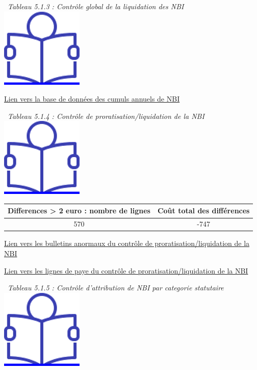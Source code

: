 ~\emph{Tableau 5.1.3 : Contrôle global de la liquidation des NBI} ~
\href{../Docs/Notices/fiche_NBI_glob.odt}{\includegraphics{icones/Notice.png}}

\href{../Bases/Fiabilite/cumuls.nbi.csv}{Lien vers la base de données des
cumuls annuels de NBI}

~\emph{Tableau 5.1.4 : Contrôle de proratisation/liquidation de la NBI}
~
\href{../Docs/Notices/fiche_NBI_prorat.odt}{\includegraphics{icones/Notice.png}}

\begin{longtable}[]{@{}cc@{}}
\toprule
Differences \textgreater{} 2 euro : nombre de lignes & Coût total des
différences\tabularnewline
\midrule
\endhead
570 & -747\tabularnewline
\bottomrule
\end{longtable}

\href{../Bases/Fiabilite/lignes.nbi.anormales.mensuel.csv}{Lien vers les
bulletins anormaux du contrôle de proratisation/liquidation de la NBI}

\href{../Bases/Fiabilite/lignes.paie.nbi.anormales.mensuel.csv}{Lien vers
les lignes de paye du contrôle de proratisation/liquidation de la NBI}

~\emph{Tableau 5.1.5 : Contrôle d'attribution de NBI par categorie
statutaire} ~
\href{../Docs/Notices/fiche_plafonds_NBI.odt}{\includegraphics{icones/Notice.png}}

